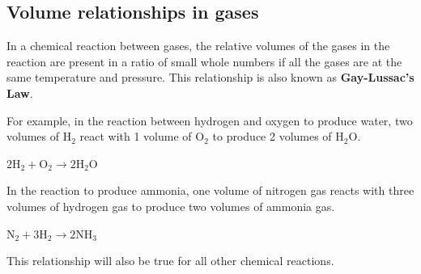             \subsection*{Volume relationships in gases}
            \nopagebreak
      \label{m38711*id65179}In a chemical reaction between gases, the relative volumes of the gases in the reaction are present in a ratio of small whole numbers if all the gases are at the same temperature and pressure. This relationship is also known as \textbf{Gay-Lussac's Law}.\par 
      \label{m38711*id65189}For example, in the reaction between hydrogen and oxygen to produce water, two volumes of $\mathrm{H}{}_{2}$ react with 1 volume of $\mathrm{O}{}_{2}$ to produce 2 volumes of $\mathrm{H}{}_{2}\mathrm{O}$.\par 
      \label{m38711*id65237}$2\mathrm{H}{}_{2}+\mathrm{O}{}_{2}\to 2\mathrm{H}{}_{2}\mathrm{O}$\par 
      \label{m38711*id65282}In the reaction to produce ammonia, one volume of nitrogen gas reacts with three volumes of hydrogen gas to produce two volumes of ammonia gas.\par 
      \label{m38711*id65286}$\mathrm{N}{}_{2}+3\mathrm{H}{}_{2}\to 2\mathrm{NH}{}_{3}$
      \par 
      \label{m38711*id65329}This relationship will also be true for all other chemical reactions.\par 
    \label{m38711*cid8}
